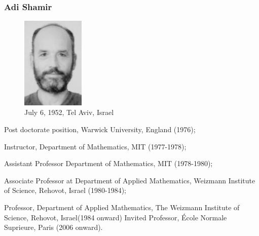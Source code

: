 \documentclass[slidestop,compress,mathserif]{beamer}
\begin{document}
\begin{frame}
  \frametitle{Adi Shamir}
  \begin{multicols}{2}
    \begin{minipage}[c]{0.5\textwidth}
      \begin{figure}[H]
        \includegraphics[width=3cm]{Shamir.jpg}
        \caption{July 6, 1952, Tel Aviv, Israel}
      \end{figure}
    \end{minipage}

     \footnotesize
    Post doctorate position, Warwick University, England (1976); 
    
    Instructor, Department of Mathematics, MIT (1977-1978); 
    
    Assistant Professor Department of Mathematics, MIT (1978-1980);
    
    Associate Professor at Department of Applied Mathematics, Weizmann Institute of Science, Rehovot, Israel (1980-1984);
    
    Professor, Department of Applied Mathematics, The Weizmann Institute of Science, Rehovot, Israel(1984 onward) Invited Professor, École Normale Suprieure, Paris (2006 onward).
  \end{multicols}
  
\end{frame}
\end{document}
